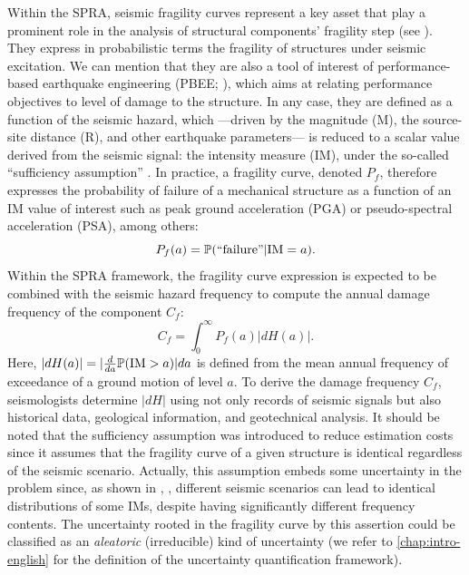 Within the SPRA, seismic fragility curves represent a key asset that play a prominent role in the analysis of structural components' fragility step (see  \cite{epri_advanced_2011}).
They express in probabilistic terms the fragility of structures under seismic excitation. We can mention that they are also a tool of interest of performance-based earthquake engineering (PBEE; \cite{ghobarah_performance-based_2001,noh_development_2014}), 
which aims at relating performance objectives to level of damage to the structure.
In any case, they are defined as a function of the seismic hazard, which ---driven by the magnitude (M), the source-site distance (R), and other earthquake parameters--- is reduced to a scalar value derived from the seismic signal: the intensity measure (IM), under the so-called ``sufficiency assumption'' \citep{cornell_hazard_2004,luco_structure-specific_2007}.
In practice, a fragility curve, denoted $P_f$, therefore expresses the probability of failure of a mechanical structure as a function of an IM value of interest such as peak ground acceleration (PGA) or pseudo-spectral acceleration (PSA), among others:
    \begin{equation}
        P_f(a) = \mathbb{P}(\text{``failure''}|\text{IM}=a).
    \end{equation}
Within the SPRA framework, the fragility curve expression is expected to be combined with the seismic hazard frequency to compute the  annual damage frequency of the component $C_f$:
    \begin{equation}\label{eq:intro-frags:damagefrequency}
        C_f =  \int_0^\infty P_f(a)\left|dH(a)\right|.
    \end{equation}
Here, $|dH(a)|=|\frac{d}{da}\mathbb{P}(\text{IM}>a)|da$ is defined from the mean annual  frequency of exceedance of a ground motion of level $a$. %
To derive the damage frequency $C_f$, seismologists determine $|dH|$ using not only records of seismic signals but also historical data, geological information, and geotechnical analysis.
It should be noted that the sufficiency assumption was introduced to reduce estimation costs since it assumes that the fragility curve of a given structure is identical regardless of the seismic scenario.
Actually, this assumption embeds some uncertainty in the problem since, as shown in \citeauthor{radu_earthquake-source-based_2018}, , %
different seismic scenarios can lead to identical distributions of some IMs, despite having significantly different frequency contents.
The uncertainty rooted in the fragility curve by this assertion could be classified as an \emph{aleatoric} (irreducible) kind of uncertainty
 (we refer to \cref{chap:intro-english} for the definition of the uncertainty quantification framework).


